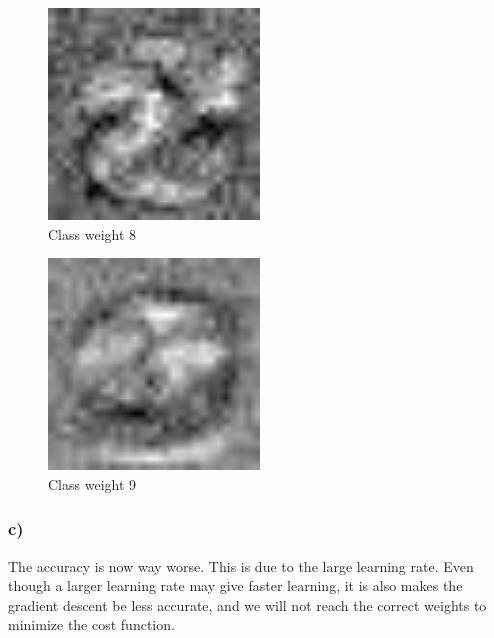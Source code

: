 \begin{figure}[]
    \centering
    \includegraphics[width=0.50\textwidth]{figures/weights/class_8_weight_image.jpg}
    \caption{Class weight 8}
    \label{fig:class_weight_8}
\end{figure}

\begin{figure}[]
    \centering
    \includegraphics[width=0.50\textwidth]{figures/weights/class_9_weight_image.jpg}
    \caption{Class weight 9}
    \label{fig:class_weight_9}
\end{figure}

\subsubsection*{c)}
The accuracy is now way worse. This is due to the large learning rate. Even though a larger learning rate may give faster learning, it is also makes the gradient descent be less accurate, and we will not reach the correct weights to minimize the cost function. 


